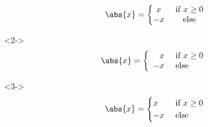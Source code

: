 \begin{frame}[fragile]
\begin{columns}
\begin{column}{0.5\textwidth}
            \begin{align*}
                \abs{x} = \left\{\begin{matrix}
                    x&\text{ if $ x\geq 0 $}\\
                    -x&\text{ else}
                \end{matrix}\right.
            \end{align*}
            \begin{uncoverenv}<2->
                \begin{align*}
                    \abs{x} = \left\{\begin{array}{rl}
                        x&\text{ if $ x\geq 0 $}\\
                        -x&\text{ else}
                    \end{array}\right.
                \end{align*}
            \end{uncoverenv}
            \begin{uncoverenv}<3->
                \begin{align*}
                    \abs{x} = \begin{cases}
                        x&\text{ if $ x\geq 0 $}\\
                        -x&\text{ else}
                    \end{cases}
                \end{align*}
            \end{uncoverenv}
        \end{column}
    \end{columns}
\end{frame}



